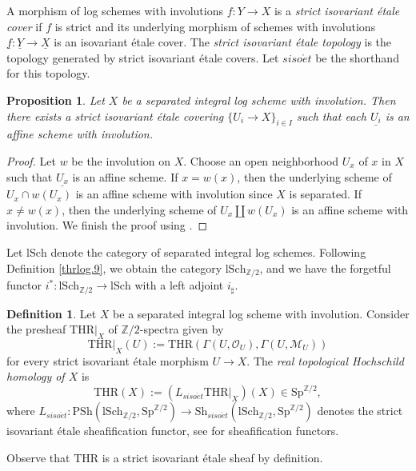 \documentclass[10pt]{amsart}
\newtheorem{prop}[thm]{Proposition}
\theoremstyle{definition}
\newtheorem{df}[thm]{Definition}
\theoremstyle{remark}
\numberwithin{equation}{section}
\newcommand{\Z}{\mathbb{Z}}
\newcommand{\cM}{\mathcal{M}}
\newcommand{\cO}{\mathcal{O}}
\newcommand{\et}{{\acute{e}t}}
\newcommand{\ul}{\underline}
\newcommand{\Sh}{\mathrm{Sh}}
\newcommand{\PSh}{\mathrm{PSh}}
\newcommand{\Sp}{\mathrm{Sp}}
\newcommand{\lSch}{\mathrm{lSch}}
\newcommand{\THR}{\mathrm{THR}}
\newcommand{\Ztwo}{{\mathbb{Z}/2}}
\begin{document}
A morphism of log schemes with involutions $f\colon Y\to X$ is a \emph{strict isovariant \'etale cover} if $f$ is strict and its underlying morphism of schemes with involutions $\ul{f}\colon \ul{Y}\to \ul{X}$ is an isovariant \'etale cover.
The \emph{strict isovariant \'etale topology} is the topology generated by strict isovariant \'etale covers.
Let $siso\et$ be the shorthand for this topology.



\begin{prop}
\label{siso.4}
Let $X$ be a separated integral log scheme with involution.
Then there exists a strict isovariant \'etale covering $\{U_i\to X\}_{i\in I}$ such that each $\ul{U_i}$ is an affine scheme with involution.
\end{prop}
\begin{proof}
Let $w$ be the involution on $X$.
Choose an open neighborhood $U_x$ of $x$ in $X$ such that $\ul{U_x}$ is an affine scheme.
If $x=w(x)$,
then the underlying scheme of $U_x\cap w(U_x)$ is an affine scheme with involution since $X$ is separated.
If $x\neq w(x)$,
then the underlying scheme of $U_x\amalg w(U_x)$ is an affine scheme with involution.
We finish the proof using \cite[Corollary 2.19]{HeKO}.
\end{proof}



Let $\lSch$ denote the category of separated integral log schemes.
Following Definition \ref{thrlog.9},
we obtain the category
$\lSch_{\Ztwo}$,
and we have the forgetful functor $i^*\colon \lSch_{\Ztwo}\to \lSch$ with a left adjoint $i_\sharp$.


\begin{df}
\label{descent.4}
Let $X$ be a separated integral log scheme with involution.
Consider the presheaf $\THR|_X$ of $\Z/2$-spectra
given by
\[
\THR|_X(U)
:=\THR(\Gamma(U,\cO_U),\Gamma(U,\cM_U))
\]
for every strict isovariant \'etale morphism $U\to X$.
The \emph{real topological Hochschild homology of $X$} is
\[
\THR(X)
:=
(L_{siso\et} \THR|_X)(X)\in \Sp^{\Z/2},
\]
where $L_{siso\et}\colon \PSh(\lSch_{\Z/2},\Sp^{\Z/2})\to \Sh_{siso\et}(\lSch_{\Z/2},\Sp^{\Z/2})$ denotes the strict isovariant \'etale sheafification functor, see \cite[Lemma 1.3.4.3]{SAG} for sheafification functors.

Observe that $\THR$ is a strict isovariant \'etale sheaf by definition.
\end{df}
\end{document}
